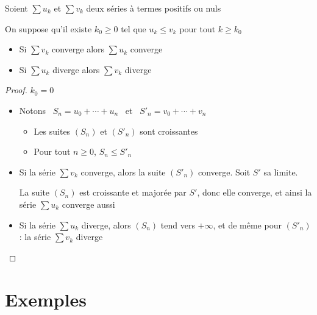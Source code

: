 \begin{frame}

\begin{theoreme}[de comparaison]
\pause
Soient $\sum u_k$ et $\sum v_k$ deux séries à termes positifs ou nuls

\pause
On suppose qu'il existe $k_0\ge 0$ tel que $u_k \le v_k$ pour tout $k\ge k_0$
\begin{itemize}
\item\pause Si $\sum v_k$ converge alors $\sum u_k$ converge
\item\pause Si $\sum u_k$ diverge alors $\sum v_k$ diverge
\end{itemize}
\end{theoreme}

\pause
\begin{proof}
$k_0=0$
\begin{itemize}
\item\pause Notons \ $S_n=u_0+\cdots+u_n$ \ et \ $S'_n = v_0+\cdots+v_n$

\begin{itemize}
\item\pause Les suites $(S_n)$ et $(S'_n)$ sont croissantes
\item\pause Pour tout $n \ge 0$, $S_n\le S'_n$
\end{itemize}
\item\pause Si la série $\sum v_k$ converge, alors la suite
$(S'_n)$ converge. Soit $S'$ sa limite. 

\pause
La suite $(S_n)$ est croissante et majorée par $S'$, \pause donc elle converge, et ainsi la série $\sum u_k$ converge aussi
\item\pause Si la série $\sum u_k$ diverge, alors $(S_n)$ tend vers $+\infty$, \pause et de même pour $(S'_n)$ : la série $\sum v_k$ diverge\qedhere
\end{itemize}
\end{proof}
\end{frame}


\section{Exemples}

